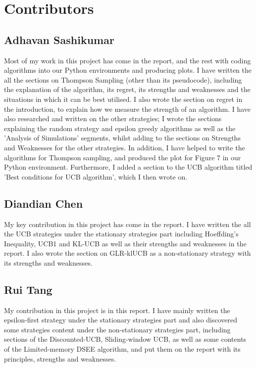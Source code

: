 \section{Contributors}\label{sec:contributors}

\subsection{Adhavan Sashikumar}\label{subsec:adhavan-sashikumar}
Most of my work in this project has come in the report, and the rest with coding algorithms into our Python environments and producing plots.
I have written the all the sections on Thompson Sampling (other than its pseudocode), including the explanation of the algorithm, its regret, its strengths and weaknesses and the situations in which it can be best utilised.
I also wrote the section on regret in the introduction, to explain how we measure the strength of an algorithm.
I have also researched and written on the other strategies;
I wrote the sections explaining the random strategy and epsilon greedy algorithms as well as the 'Analysis of Simulations' segments, whilst adding to the sections on Strengths and Weaknesses for the other strategies.
In addition, I have helped to write the algorithms for Thompson sampling, and produced the plot for Figure 7 in our Python environment.
Furthermore, I added a section to the UCB algorithm titled 'Best conditions for UCB algorithm', which I then wrote on.

\subsection{Diandian Chen}\label{subsec:diandian-chen}
My key contribution in this project has come in the report.
I have written the all the UCB strategies  under the stationary strategies part including Hoeffding's Inequality, UCB1 and KL-UCB as well as their strengths and weaknesses in the report.
I also wrote the section on GLR-klUCB as a non-stationary strategy with its strengths and weaknesses.

\subsection{Rui Tang}\label{subsec:rui-tang}
My contribution in this project is in this report.
\newline I have mainly written the epsilon-first strategy under the stationary strategies part and also discovered some strategies content under the non-stationary strategies part, including sections of the Discounted-UCB, Sliding-window UCB, as well as  some contents of the Limited-memory DSEE algorithm, and put them on the report with its principles, strengths and weaknesses.


